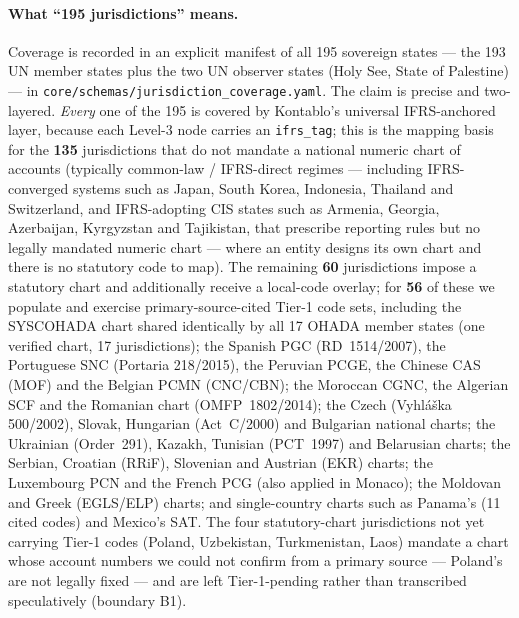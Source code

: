 \paragraph{What ``195 jurisdictions'' means.} Coverage is recorded in an
explicit manifest of all 195 sovereign states --- the 193 UN member states plus
the two UN observer states (Holy See, State of Palestine) --- in
\texttt{core/schemas/jurisdiction\_coverage.yaml}. The claim is precise and
two-layered. \emph{Every} one of the 195 is covered by Kontablo's universal
IFRS-anchored layer, because each Level-3 node carries an \texttt{ifrs\_tag};
this is the mapping basis for the \textbf{135} jurisdictions that do not mandate
a national numeric chart of accounts (typically common-law / IFRS-direct
regimes --- including IFRS-converged systems such as Japan, South Korea,
Indonesia, Thailand and Switzerland, and IFRS-adopting CIS states such as
Armenia, Georgia, Azerbaijan, Kyrgyzstan and Tajikistan, that prescribe
reporting rules but no legally mandated numeric chart --- where an entity
designs its own chart and there is no statutory code to map). The remaining
\textbf{60} jurisdictions impose a statutory chart and additionally receive a
local-code overlay; for \textbf{56} of these we populate
and exercise primary-source-cited Tier-1 code sets, including the SYSCOHADA
chart shared identically by all 17 OHADA member states (one verified chart, 17
jurisdictions); the Spanish PGC (RD~1514/2007), the Portuguese SNC (Portaria
218/2015), the Peruvian PCGE, the Chinese CAS (MOF) and the Belgian PCMN
(CNC/CBN); the Moroccan CGNC, the Algerian SCF and the Romanian chart
(OMFP~1802/2014); the Czech (Vyhláška 500/2002), Slovak, Hungarian (Act~C/2000)
and Bulgarian national charts; the Ukrainian (Order~291), Kazakh, Tunisian
(PCT~1997) and Belarusian charts; the Serbian, Croatian (RRiF), Slovenian and
Austrian (EKR) charts; the Luxembourg PCN and the French PCG (also applied in
Monaco); the Moldovan and Greek (EGLS/ELP) charts; and single-country charts
such as Panama's (11 cited codes) and Mexico's SAT. The four statutory-chart
jurisdictions not yet carrying Tier-1 codes (Poland, Uzbekistan, Turkmenistan,
Laos) mandate a chart whose account numbers we could not confirm from a primary
source --- Poland's are not legally fixed --- and are left Tier-1-pending rather
than transcribed speculatively (boundary B1).

